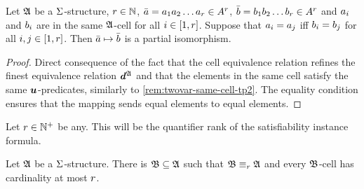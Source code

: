 \begin{remark}\label{rem:monadic-same-cell-r}
Let $\mathfrak{A}$ be a $\mathrm{\Sigma}$-structure, $r \in \mathbb{N}$,
$\bar{a} = a_{1}a_{2}\dots a_{r} \in A^r$,
$\bar{b} = b_{1}b_{2}\dots b_{r} \in A^r$ and $a_{i}$ and $b_{i}$
are in the same $\mathfrak{A}$-cell for all $i \in [1,r]$.
Suppose that $a_{i} = a_{j}$ iff $b_{i} = b_{j}$ for all $i, j \in
[1,r]$.
Then $\bar{a} \mapsto \bar{b}$ is a partial isomorphism.
\end{remark}
\begin{proof}
Direct consequence of the fact that the cell equivalence relation refines the
finest equivalence relation $\bm{d}^{\mathfrak{A}}$ and that the elements in the same cell
satisfy the same $\bm{u}$-predicates, similarly to \cref{rem:twovar-same-cell-tp2}.
The equality condition ensures that the mapping sends equal elements to equal
elements.
\end{proof}
Let $r \in \mathbb{N}^{+}$ be any. This will be the quantifier rank of the
satisfiability instance formula.
\begin{lemma}\label{lem:monadic-cell-r}
Let $\mathfrak{A}$ be a $\mathrm{\Sigma}$-structure. There is $\mathfrak{B} \subseteq \mathfrak{A}$ such that
$\mathfrak{B} \equiv_{r} \mathfrak{A}$ and every $\mathfrak{B}$-cell has cardinality at most $r$.
\end{lemma}

